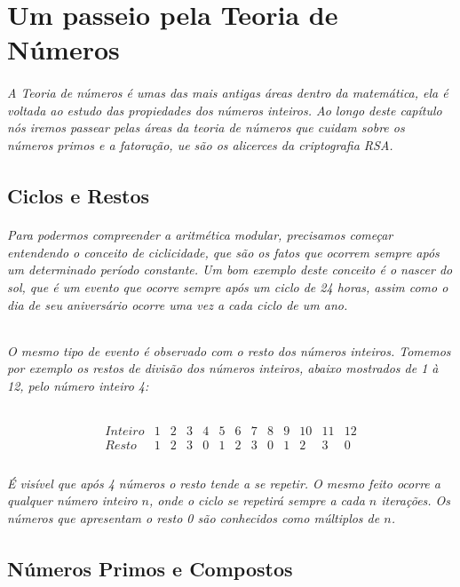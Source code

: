 \chapter {Um passeio pela Teoria de N\'umeros}
\label{Num}
\subparagraph{
A Teoria de n\'umeros \'e umas das mais antigas \'areas dentro da matem\'atica, ela \'e voltada ao estudo das propiedades dos n\'umeros inteiros. Ao longo deste cap\'itulo n\'os iremos passear pelas \'areas da teoria de n\'umeros que cuidam sobre os n\'umeros primos e a fatora\c{c}\~ao, ue s\~ao os alicerces da criptografia RSA.
}
\section{Ciclos e Restos}	
\subparagraph{
Para podermos compreender a aritm\'etica modular, precisamos come\c{c}ar entendendo o conceito de ciclicidade, que s\~ao os fatos que ocorrem sempre ap\'os um determinado per\'iodo constante. Um bom exemplo deste conceito \'e o nascer do sol, que \'e um evento que ocorre sempre ap\'os um ciclo de {24} horas, assim como o dia de seu anivers\'ario ocorre uma vez a cada ciclo de um ano.
}
\subparagraph{
O mesmo tipo de evento \'e observado com o resto dos n\'umeros inteiros. Tomemos por exemplo os restos de divis\~ao dos n\'umeros inteiros, abaixo mostrados de 1 \`a 12, pelo n\'umero inteiro {4}:
}

\[
\begin{array}{ccccccccccccc}
  {Inteiro} & 1 & 2 & 3 & 4 & 5 & 6 & 7 & 8 & 9 & 10 &  11 & 12 \\  
	{Resto} & 1 & 2 & 3 & 0 & 1 & 2 & 3 & 0 & 1 & 2  &  3 & 0 \\ 
\end{array}
\]

\subparagraph{
\'E vis\'ivel que ap\'os {4} n\'umeros o resto tende a se repetir. O mesmo feito ocorre a qualquer n\'umero inteiro $n$, onde o ciclo se repetir\'a sempre a cada $n$ itera\c{c}\~oes. Os n\'umeros que apresentam o resto {0} s\~ao conhecidos como m\'ultiplos de $n$.
}

\section{N\'{u}meros Primos e Compostos}

